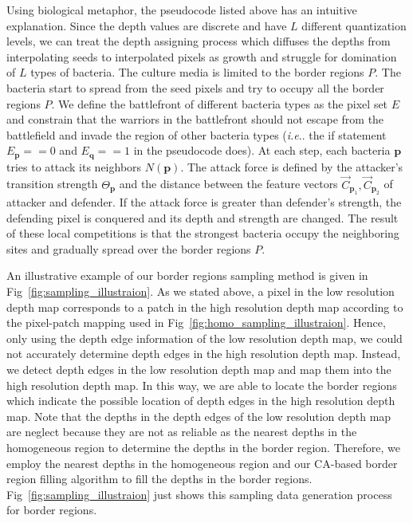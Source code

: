 \documentclass[preprint,10pt,5p,times,twocolumn]{elsarticle}
\makeatletter
\DeclareRobustCommand\onedot{\futurelet\@let@token\@onedot}
\def\@onedot{\ifx\@let@token.\else.\null\fi\xspace}
\def\ie{\emph{i.e}\onedot} \def\Ie{\emph{I.e}\onedot}
\makeatother
\begin{document}
Using biological metaphor, the pseudocode listed above has an intuitive explanation. Since the depth values are discrete and have $L$ different quantization levels, we can treat the depth assigning process which diffuses the depths from interpolating seeds to interpolated pixels as
growth and struggle for domination of $L$ types of bacteria. The culture media is limited to the border regions $P$. The bacteria start to spread from the seed pixels and try to occupy all the border regions $P$. We define the battlefront of different bacteria types as the pixel set $E$ and constrain that the warriors in the battlefront should not escape from the battlefield and invade the region of other bacteria types (\ie the if statement $E_\mathbf{p}==0$ and $E_\mathbf{q}==1$ in the pseudocode does). At each step, each bacteria $\mathbf{p}$ tries to attack its neighbors $N(\mathbf{p})$. The attack force is defined by the attacker's transition strength $\Theta_\mathbf{p}$ and the distance between the feature vectors $\overrightarrow{C}_{\mathbf{p}_1},\overrightarrow{C}_{\mathbf{p}_2}$ of attacker and defender. If the attack force is greater than defender's strength, the defending pixel is conquered and its depth and strength are changed. The result of these local competitions is that the strongest bacteria occupy the neighboring sites and gradually spread over the border regions $P$.


An illustrative example of our border regions sampling method is given in Fig~\ref{fig:sampling_illustraion}. As we stated above, a pixel in the low resolution depth map corresponds to a patch in the high resolution depth map according to the pixel-patch mapping used in Fig~\ref{fig:homo_sampling_illustraion}. Hence, only using the depth edge information of the low resolution depth map, we could not accurately determine  depth edges in the high resolution depth map. Instead, we detect depth edges in the low resolution depth map and map them into the high resolution depth map. In this way, we are able to locate the border regions which indicate the possible location of depth edges in the high resolution depth map. Note that the depths in the depth edges of the low resolution depth map are neglect because they are not as reliable as the nearest depths in the homogeneous region to determine the depths in the border region. Therefore, we employ the nearest depths in the homogeneous region and our CA-based border region filling algorithm to fill the depths in the border regions. Fig~\ref{fig:sampling_illustraion} just shows this sampling data generation process for border regions. 
\end{document}
